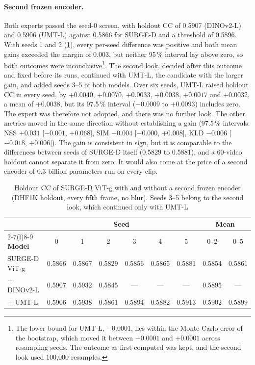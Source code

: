 \paragraph{Second frozen encoder.} Both experts passed the seed-0 screen, with
holdout \acrshort{CC} of 0.5907 (DINOv2-L) and 0.5906 (\acrshort{UMT}-L) against
0.5866 for SURGE-D and a threshold of 0.5896. With seeds 1 and 2
(\cref{tab:second-encoder}), every per-seed difference was positive and both
mean gains exceeded the margin of 0.003, but neither 95\,\% interval lay above
zero, so both outcomes were inconclusive\footnote{The lower bound for
\acrshort{UMT}-L, $-0.0001$, lies within the Monte Carlo error of the bootstrap,
which moved it between $-0.0001$ and $+0.0001$ across resampling seeds. The
outcome as first computed was kept, and the second look used 100,000
resamples.}. The second look, decided after this outcome and fixed before its
runs, continued with \acrshort{UMT}-L, the candidate with the larger gain, and
added seeds 3--5 of both models. Over six seeds, \acrshort{UMT}-L raised holdout
\acrshort{CC} in every seed, by $+0.0040$, $+0.0070$, $+0.0033$, $+0.0038$,
$+0.0017$ and $+0.0032$, a mean of $+0.0038$, but its 97.5\,\% interval
($-0.0009$ to $+0.0093$) includes zero. The expert was therefore not adopted,
and there was no further look. The other metrics moved in the same direction
without establishing a gain (97.5\,\% intervals: \acrshort{NSS} $+0.031$
[$-0.001$, $+0.068$], \acrshort{SIM} $+0.004$ [$-0.000$, $+0.008$], \acrshort{KLD}
$-0.006$ [$-0.018$, $+0.006$]). The gain is consistent in sign, but it is
comparable to the differences between seeds of SURGE-D itself (0.5829 to
0.5881), and a 60-video holdout cannot separate it from zero. It would also
come at the price of a second encoder of 0.3 billion parameters run on every
clip.

\begin{table}[htbp]
  \centering
  \caption{Holdout \acrshort{CC} of SURGE-D \acrshort{ViT}-g with and without a
  second frozen encoder (DHF1K holdout, every fifth frame, no blur). Seeds 3--5
  belong to the second look, which continued only with
  \acrshort{UMT}-L}\label{tab:second-encoder}
  \footnotesize
  \setlength{\tabcolsep}{4.5pt}
  \begin{tabular}{@{}lcccccccc@{}}
    \toprule
    & \multicolumn{6}{c}{\textbf{Seed}} & \multicolumn{2}{c}{\textbf{Mean}} \\
    \cmidrule(lr){2-7}\cmidrule(l){8-9}
    \textbf{Model} & 0 & 1 & 2 & 3 & 4 & 5 & 0--2 & 0--5 \\
    \midrule
    SURGE-D \acrshort{ViT}-g & 0.5866 & 0.5867 & 0.5829 & 0.5856 & 0.5865 & 0.5881 & 0.5854 & 0.5861 \\
    + DINOv2-L          & 0.5907 & 0.5932 & 0.5845 & --- & --- & --- & 0.5895 & --- \\
    + \acrshort{UMT}-L  & 0.5906 & 0.5938 & 0.5861 & 0.5894 & 0.5882 & 0.5913 & 0.5902 & 0.5899 \\
    \bottomrule
  \end{tabular}
\end{table}

